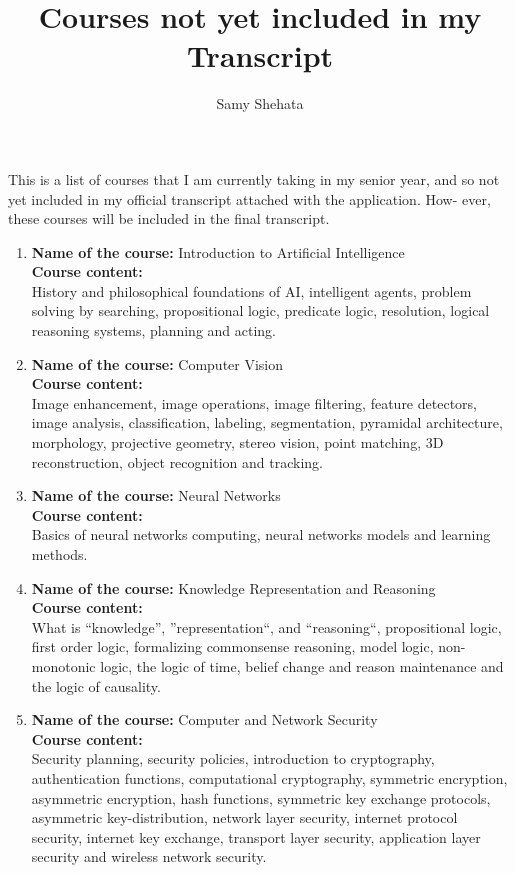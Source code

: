 \documentclass{article}
\title{ Courses not yet included in my Transcript}
\author{Samy Shehata}
\begin{document}
\maketitle

This is a list of courses that I am currently taking in my senior year, and so
not yet included in my official transcript attached with the application. How-
ever, these courses will be included in the final transcript.

\begin{enumerate}
  \item \textbf{Name of the course:} Introduction to Artificial Intelligence\\
    \textbf{Course content:}\\
    History and philosophical foundations of AI, intelligent agents, problem
    solving by searching, propositional logic, predicate logic, resolution,
    logical
    reasoning systems, planning and acting.

    
  \item \textbf{Name of the course:} Computer Vision\\
    \textbf{Course content:}\\
    Image enhancement, image operations, image filtering, feature detectors,
    image analysis, classification, labeling, segmentation, pyramidal architecture, morphology, projective geometry, stereo vision, point matching, 3D
    reconstruction, object recognition and tracking.

  \item \textbf{Name of the course:} Neural Networks\\
    \textbf{Course content:}\\
     Basics of neural networks computing, neural networks models and learning
     methods.

  \item \textbf{Name of the course:} Knowledge Representation and Reasoning\\
    \textbf{Course content:}\\
What is ``knowledge'', ''representation``, and ``reasoning``, propositional
logic, first order logic, formalizing commonsense reasoning, model logic,
non-monotonic logic, the logic of time, belief change and reason maintenance and the logic of causality.

  \item \textbf{Name of the course:} Computer and Network Security\\
    \textbf{Course content:}\\
Security planning, security policies, introduction to cryptography,
authentication functions, computational cryptography, symmetric encryption,
asymmetric encryption, hash functions, symmetric key exchange protocols,
asymmetric key-distribution, network layer security, internet protocol security, internet key exchange, transport layer security, application
layer security and wireless network security.


\end{enumerate}
\end{document}

